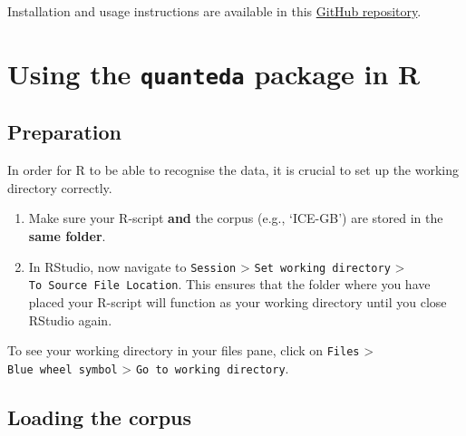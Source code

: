 \documentclass[
  11pt,
  letterpaper,
  DIV=11,
  numbers=noendperiod]{scrreprt}
\begin{document}
Installation and usage instructions are available in this
\href{https://github.com/VBuskin/quanteda_app}{GitHub repository}.

\section{\texorpdfstring{Using the \texttt{quanteda} package in
R}{Using the quanteda package in R}}\label{using-the-quanteda-package-in-r}

\subsection{Preparation}\label{preparation-1}

\begin{tcolorbox}[enhanced jigsaw, toprule=.15mm, opacitybacktitle=0.6, coltitle=black, arc=.35mm, colback=white, title=\textcolor{quarto-callout-warning-color}{\faExclamationTriangle}\hspace{0.5em}{Working directory}, titlerule=0mm, toptitle=1mm, bottomtitle=1mm, breakable, rightrule=.15mm, opacityback=0, bottomrule=.15mm, leftrule=.75mm, colframe=quarto-callout-warning-color-frame, left=2mm, colbacktitle=quarto-callout-warning-color!10!white]

In order for R to be able to recognise the data, it is crucial to set up
the working directory correctly.

\begin{enumerate}
\def\labelenumi{\arabic{enumi}.}
\item
  Make sure your R-script \textbf{and} the corpus (e.g., `ICE-GB') are
  stored in the \textbf{same folder}.
\item
  In RStudio, now navigate to \texttt{Session} \textgreater{}
  \texttt{Set\ working\ directory} \textgreater{}
  \texttt{To\ Source\ File\ Location}. This ensures that the folder
  where you have placed your R-script will function as your working
  directory until you close RStudio again.
\end{enumerate}

To see your working directory in your files pane, click on
\texttt{Files} \textgreater{}
\texttt{\textquotesingle{}Blue\ wheel\ symbol\textquotesingle{}}
\textgreater{} \texttt{Go\ to\ working\ directory}.

\end{tcolorbox}

\subsection{Loading the corpus}\label{loading-the-corpus}
\end{document}
